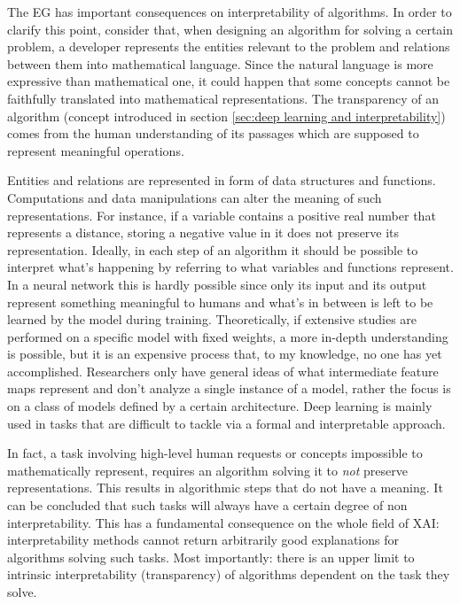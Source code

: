 The EG has important consequences on interpretability of algorithms.
In order to clarify this point, consider that, when designing an algorithm for solving a certain problem, a developer represents the entities relevant to the problem and relations between them into mathematical language.
Since the natural language is more expressive than mathematical one, it could happen that some concepts cannot be faithfully translated into mathematical representations.
The transparency of an algorithm (concept introduced in section \ref{sec:deep learning and interpretability}) comes from the human understanding of its passages which are supposed to represent meaningful operations.

Entities and relations are represented in form of data structures and functions.
Computations and data manipulations can alter the meaning of such representations.
For instance, if a variable contains a positive real number that represents a distance, storing a negative value in it does not preserve its representation.
Ideally, in each step of an algorithm it should be possible to interpret what's happening by referring to what variables and functions represent.
In a neural network this is hardly possible since only its input and its output represent something meaningful to humans and what's in between is left to be learned by the model during training.
Theoretically, if extensive studies are performed on a specific model with fixed weights, a more in-depth understanding is possible, but it is an expensive process that, to my knowledge, no one has yet accomplished.
Researchers only have general ideas of what intermediate feature maps represent and don't analyze a single instance of a model, rather the focus is on a class of models defined by a certain architecture.
Deep learning is mainly used in tasks that are difficult to tackle via a formal and interpretable approach.

In fact, a task involving high-level human requests or concepts impossible to mathematically represent, requires an algorithm solving it to \textit{not} preserve representations.
This results in algorithmic steps that do not have a meaning.
It can be concluded that such tasks will always have a certain degree of non interpretability.
This has a fundamental consequence on the whole field of XAI: interpretability methods cannot return arbitrarily good explanations for algorithms solving such tasks.
Most importantly: there is an upper limit to intrinsic interpretability (transparency) of algorithms dependent on the task they solve.

